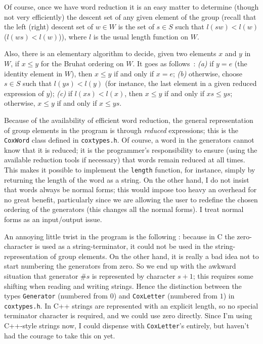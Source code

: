 \documentclass[11pt]{article}
\begin{document}
Of course, once we have word reduction it is an easy matter to determine
(though not very efficiently) the descent set of any given element of
the group (recall that the left (right) descent set of $w\in W$ is the set
of $s\in S$ such that $l(sw)<l(w)$ ($l(ws)<l(w)$)), where $l$ is the usual
length function on $W$.

Also, there is an elementary algorithm to decide, given two elements $x$ and
$y$ in $W$, if $x\leq y$ for the Bruhat ordering on $W$. It goes as follows~:
{\it (a)} if $y=e$ (the identity element in $W$), then $x\leq y$ if and only if
$x=e$; {\it (b)} otherwise, choose $s\in S$ such that $l(ys)<l(y)$ (for 
instance, the last element in a given reduced expression of $y$); {\it (c)} 
if $l(xs)<l(x)$, then $x\leq y$ if and only if $xs\leq ys$; otherwise,
$x\leq y$ if and only if $x\leq ys$.

Because of the availability of efficient word reduction, the general
representation of group elements in the program is through {\em reduced}
expressions; this is the {\tt CoxWord} class defined in {\tt coxtypes.h}.
Of course, a word in the generators cannot know that it is reduced; it is
the programmer's responsibility to ensure (using the available reduction
tools if necessary) that words remain reduced at all times. This makes
it possible to implement the {\tt length} function, for instance, simply
by returning the length of the word as a string. On the other hand, I do
not insist that words always be normal forms; this would impose too heavy
an overhead for no great benefit, particularly since we are allowing the
user to redefine the chosen ordering of the generators (this changes all
the normal forms). I treat normal forms as an input/output issue.

An annoying little twist in the program is the following : because in C
the zero-character is used as a string-terminator, it could not be used in
the string-representation of group elements. On the other hand, it is really
a bad idea not to start numbering the generators from zero. So we end up
with the awkward situation that generator \#$s$ is represented by character
$s+1$; this requires some shifting when reading and writing strings. Hence
the distinction between the types {\tt Generator} (numbered from $0$) and
{\tt CoxLetter} (numbered from $1$) in {\tt coxtypes.h}. In C++ strings are
represented with an explicit length, so no special terminator character is
required, and we could use zero directly. Since I'm using C++-style strings
now, I could dispense with {\tt CoxLetter}'s entirely, but haven't had the
courage to take this on yet.
\end{document}
